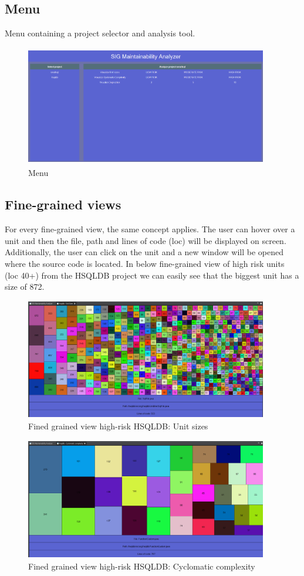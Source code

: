 \documentclass{article}
\begin{document}
\subsection{Menu}
Menu containing a project selector and analysis tool.
\begin{figure}[!htbp]
	\centering
	\label{fig:vis-menu}
	\caption{Menu}
	\includegraphics[width=400px, height=200px]{vis_menu.png}
\end{figure}

\subsection{Fine-grained views}
For every fine-grained view, the same concept applies. 
The user can hover over a unit and then the file, path and lines of code (loc) will be displayed on screen. 
Additionally, the user can click on the unit and a new window will be opened where the source code is located.
In below fine-grained view of high risk units (loc 40+) from the HSQLDB project we can easily see that the biggest unit has a size of 872. 

\begin{figure}[!htbp]
	\centering
	\label{fig:unit-sizes}
	\caption{Fined grained view high-risk HSQLDB: Unit sizes}
	\includegraphics[width=400px, height=200px]{hsqldb_unitsizes.png}
\end{figure}

\begin{figure}[!htbp]
	\centering
	\label{fig:cyclomatic-complexity}
	\caption{Fined grained view high-risk HSQLDB: Cyclomatic complexity}
	\includegraphics[width=400px, height=200px]{hsqldb_coc.png}
\end{figure}
\end{document}
